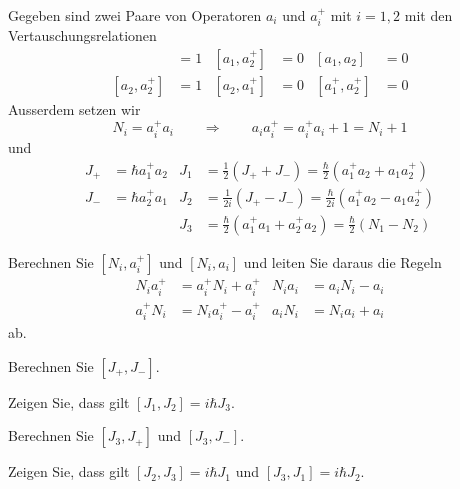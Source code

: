 Gegeben sind zwei Paare von Operatoren $a_i$ und $a_i^+$ mit $i=1,2$
mit den Vertauschungsrelationen
\begin{align*}
[a_1,a_1^+]&=1&[a_1,a_2^+]&=0&[a_1,a_2]&=0\\
[a_2,a_2^+]&=1&[a_2,a_1^+]&=0&[a_1^+,a_2^+]&=0
\end{align*}
Ausserdem setzen wir 
\[
N_i=a_i^+a_i
\qquad
\Rightarrow
\qquad
a_ia_i^+=a_i^+a_i+1=N_i+1
\]
und
\begin{align*}
J_+
&=
\hbar a_1^+a_2
&
J_1
&=
\frac12(J_++J_-)
=
\frac{\hbar}2(a_1^+a_2+a_1a_2^+)
\\
J_-
&=
\hbar a_2^+a_1
&
J_2
&=
\frac1{2i}(J_+-J_-)
=
\frac{\hbar}{2i}(a_1^+a_2-a_1a_2^+)
\\
&&
J_3
&=
\frac{\hbar}2(a_1^+a_1+a_2^+a_2)
=
\frac{\hbar}2(N_1-N_2)
\end{align*}
\begin{teilaufgaben}
\item Berechnen Sie $[N_i,a_i^+]$ und $[N_i,a_i]$ und leiten Sie daraus
die Regeln
\begin{align*}
N_ia_i^+&= a_i^+ N_i + a_i^+
&
N_ia_i  &= a_i   N_i - a_i
\\
a_i^+N_i&= N_ia_i^+ - a_i^+
&
a_i N_i  &= N_i a_i   + a_i
\end{align*}
ab.
\item Berechnen Sie $[J_+,J_-]$.
\item Zeigen Sie, dass gilt $[J_1,J_2]=i\hbar J_3$.
\item Berechnen Sie $[J_3,J_+]$ und $[J_3,J_-]$.
\item Zeigen Sie, dass gilt $[J_2,J_3]=i\hbar J_1$ und $[J_3,J_1]=i\hbar J_2$.
\end{teilaufgaben}

